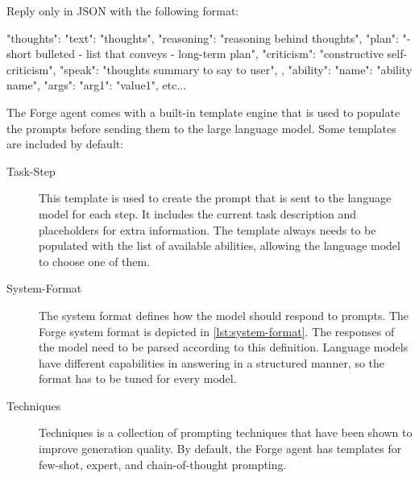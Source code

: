 \documentclass[../main.tex]{subfiles}
\begin{document}
\begin{Code}[
            caption={The system format of the Forge agent.
                        The language model is asked to only answer in this format.
                        The model generates thoughts before creating the output for the user (speak).
                        Thoughts include reasoning, a plan, and criticism.
                        After the model generates the thoughts,
                        it generates an ability proposal with the corresponding arguments.},
            label={lst:system-format},
            captionpos=b,
            float=tp]
Reply only in JSON with the following format:

{
      "thoughts": {
            "text":  "thoughts",
            "reasoning": "reasoning behind thoughts",
            "plan": "- short bulleted
                     - list that conveys
                     - long-term plan",
            "criticism": "constructive self-criticism",
            "speak": "thoughts summary to say to user",
      },
      "ability": {
            "name": "ability name",
            "args": {
                  "arg1": "value1", etc...
            }
      }
}
\end{Code}

The Forge agent comes with a built-in template engine that is used
to populate the prompts before sending them to the large language model.
Some templates are included by default:

\begin{description}
      \item[Task-Step] This template is used to create the prompt that is sent to the language model for each step.
            It includes the current task description and placeholders for extra information.
            The template always needs to be populated with the list of available abilities,
            allowing the language model to choose one of them.
      \item[System-Format] The system format defines how the model should respond to prompts.
            The Forge system format is depicted in \autoref{lst:system-format}.
            The responses of the model need to be parsed according to this definition.
            Language models have different capabilities in answering in a structured manner,
            so the format has to be tuned for every model.
      \item[Techniques] Techniques is a collection of prompting techniques that have been shown to improve generation quality.
            By default, the Forge agent has templates for few-shot, expert, and chain-of-thought prompting.
\end{description}
\end{document}

